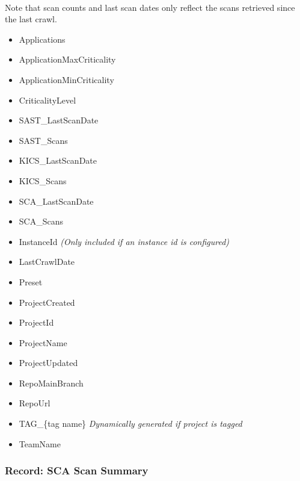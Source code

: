 \noindent\\Note that scan counts and last scan dates only reflect the scans retrieved since the last crawl.

\begin{itemize}
    \item Applications
    \item ApplicationMaxCriticality
    \item ApplicationMinCriticality
    \item CriticalityLevel
    \item SAST\_LastScanDate
    \item SAST\_Scans
    \item KICS\_LastScanDate
    \item KICS\_Scans
    \item SCA\_LastScanDate
    \item SCA\_Scans
    \item InstanceId \textit{(Only included if an instance id is configured)}
    \item LastCrawlDate
    \item Preset
    \item ProjectCreated
    \item ProjectId
    \item ProjectName
    \item ProjectUpdated
    \item RepoMainBranch
    \item RepoUrl
    \item TAG\_\{tag name\} \textit{Dynamically generated if project is tagged}
    \item TeamName
\end{itemize}


\subsubsection{Record: SCA Scan Summary}

